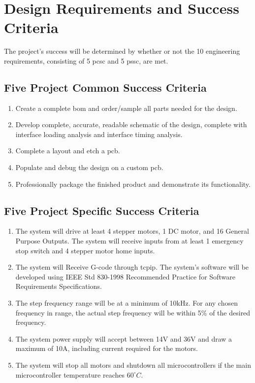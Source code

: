 \chapter{Design Requirements and Success Criteria}
The project's success will be determined by whether or not the 10 engineering requirements, consisting of 5 \gls{pcsc} and 5 \gls{pssc}, are met. 

\section{Five Project Common Success Criteria}
\begin{enumerate}
	\item Create a complete \gls{bom} and order/sample all parts needed for the design.
	\item Develop complete, accurate, readable schematic of the design, complete with interface loading analysis and interface timing analysis. 
	\item Complete a layout and etch a \gls{pcb}.
	\item Populate and debug the design on a custom \gls{pcb}.
	\item Professionally package the finished product and demonstrate its functionality.
\end{enumerate}

\section{Five Project Specific Success Criteria}
\begin{enumerate}
	\item The system will drive at least 4 stepper motors, 1 DC motor, and 16 General Purpose Outputs.
The system will receive inputs from at least 1 emergency stop switch and 4 stepper motor home inputs.
	\item The system will Receive G-code through \gls{tcpip}.
The system’s software will be developed using IEEE Std 830-1998 Recommended Practice for Software Requirements Specifications.
	\item The step frequency range will be at a minimum of 10kHz.
For any chosen frequency in range, the actual step frequency will be within 5\% of the desired frequency.
	\item The system power supply will accept between 14V and 36V and draw a maximum of 10A, including current required for the motors. 
	\item The system will stop all motors and shutdown all microcontrollers if the main microcontroller temperature reaches $60^{\circ}C$.
\end{enumerate}

